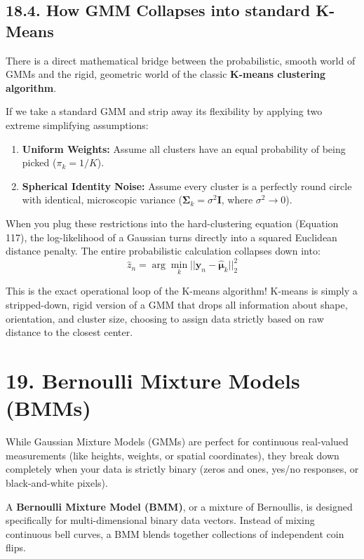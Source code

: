 \documentclass{article}
\begin{document}
\subsection*{18.4. How GMM Collapses into standard K-Means}
There is a direct mathematical bridge between the probabilistic, smooth world of GMMs and the rigid, geometric world of the classic \textbf{K-means clustering algorithm}. 

If we take a standard GMM and strip away its flexibility by applying two extreme simplifying assumptions:
\begin{enumerate}
    \item \textbf{Uniform Weights:} Assume all clusters have an equal probability of being picked ($\pi_k = 1/K$).
    \item \textbf{Spherical Identity Noise:} Assume every cluster is a perfectly round circle with identical, microscopic variance ($\boldsymbol{\Sigma}_k = \sigma^2 \mathbf{I}$, where $\sigma^2 \to 0$).
\end{enumerate}

When you plug these restrictions into the hard-clustering equation (Equation 117), the log-likelihood of a Gaussian turns directly into a squared Euclidean distance penalty. The entire probabilistic calculation collapses down into:
\begin{equation}
\hat{z}_n = \arg\min_k ||\mathbf{y}_n - \hat{\boldsymbol{\mu}}_k||_2^2 \tag{118}
\end{equation}

This is the exact operational loop of the K-means algorithm! K-means is simply a stripped-down, rigid version of a GMM that drops all information about shape, orientation, and cluster size, choosing to assign data strictly based on raw distance to the closest center.

\section*{19. Bernoulli Mixture Models (BMMs)}

While Gaussian Mixture Models (GMMs) are perfect for continuous real-valued measurements (like heights, weights, or spatial coordinates), they break down completely when your data is strictly binary (zeros and ones, yes/no responses, or black-and-white pixels). 

A \textbf{Bernoulli Mixture Model (BMM)}, or a mixture of Bernoullis, is designed specifically for multi-dimensional binary data vectors. Instead of mixing continuous bell curves, a BMM blends together collections of independent coin flips.
\end{document}
